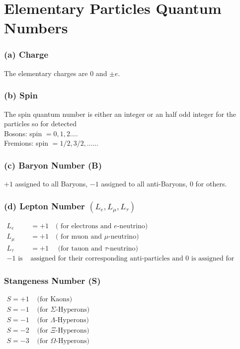 \section{Elementary Particles Quantum Numbers}
\subsubsection{(a) Charge}
The elementary charges are 0 and $\pm e$.
\subsubsection{(b) Spin}
The spin quantum number is either an integer or an half odd integer for the particles so for detected\\
Bosons: spin $=0,1,2 \ldots$.\\ 
Fremions: spin $=1 / 2,3 / 2, \ldots \ldots$
\subsubsection{(c) Baryon Number (B)}
$+1$ assigned to all Baryons, $-1$ assigned to all anti-Baryons, 0 for others.
\subsubsection{(d) Lepton Number $\left(L_e, L_\mu, L_\tau\right)$}
\begin{align*}
L_e&=+1 \quad(\text { for electrons and } e \text {-neutrino) } \\
L_\mu&=+1 \quad(\text { for muon and } \mu \text {-neutrino) } \\
L_\tau&=+1 \quad \text { (for tauon and } \tau \text {-neutrino) }\\
\text{$-1$ is }&\text{assigned for their corresponding anti-particles and 0 is assigned for others.}
\end{align*}
\subsubsection{Stangeness Number (S)}
$\begin{array}{ll}
	S=+1 & \text { (for Kaons) } \\
	S=-1 & \text { (for } \Sigma \text {-Hyperons) }\\
	S=-1 & \text { (for } \Lambda \text {-Hyperons) } \\
	S=-2 & \text { (for } \Xi \text {-Hyperons) } \\
	S=-3 & \text { (for } \Omega \text {-Hyperons) }
\end{array}$
